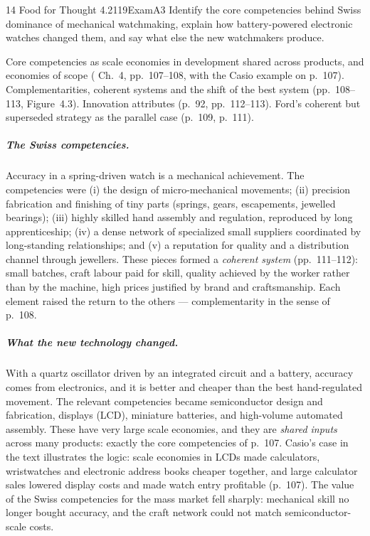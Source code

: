 \begin{exsol}{14}{\MR{} Food for Thought 4.2}{119}{Exam}{A3}
\asked Identify the core competencies behind Swiss dominance of mechanical watchmaking, explain
how battery-powered electronic watches changed them, and say what else the new watchmakers
produce.

\method Core competencies as scale economies in development shared across products, and economies
of scope (\MR{} Ch.~4, pp.~107--108, with the Casio example on p.~107). Complementarities, coherent
systems and the shift of the best system (pp.~108--113, Figure~4.3). Innovation attributes (p.~92,
pp.~112--113). Ford's coherent but superseded strategy as the parallel case (p.~109, p.~111).

\solution
\subparagraph{The Swiss competencies.} Accuracy in a spring-driven watch is a mechanical
achievement. The competencies were (i) the design of micro-mechanical movements; (ii) precision
fabrication and finishing of tiny parts (springs, gears, escapements, jewelled bearings);
(iii) highly skilled hand assembly and regulation, reproduced by long apprenticeship; (iv) a dense
network of specialized small suppliers coordinated by long-standing relationships; and (v) a
reputation for quality and a distribution channel through jewellers. These pieces formed a
\emph{coherent system} (pp.~111--112): small batches, craft labour paid for skill, quality
achieved by the worker rather than by the machine, high prices justified by brand and
craftsmanship. Each element raised the return to the others --- complementarity in the sense of
p.~108.

\subparagraph{What the new technology changed.} With a quartz oscillator driven by an integrated
circuit and a battery, accuracy comes from electronics, and it is better and cheaper than the best
hand-regulated movement. The relevant competencies became semiconductor design and fabrication,
displays (LCD), miniature batteries, and high-volume automated assembly. These have very large
scale economies, and they are \emph{shared inputs} across many products: exactly the core
competencies of p.~107. Casio's case in the text illustrates the logic: scale economies in LCDs
made calculators, wristwatches and electronic address books cheaper together, and large calculator
sales lowered display costs and made watch entry profitable (p.~107). The value of the Swiss
competencies for the mass market fell sharply: mechanical skill no longer bought accuracy, and the
craft network could not match semiconductor-scale costs.


\end{exsol}
